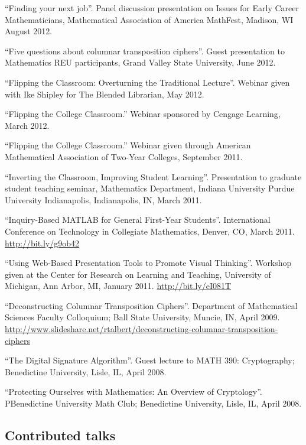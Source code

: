 \documentclass[letterpaper]{article}
\renewenvironment{itemize}{
  \begin{list}{}{
    \setlength{\leftmargin}{1.5em}
	\setlength{\itemsep}{0in}
  }
}{
  \end{list}
}
\begin{document}
\begin{itemize}
	\item ``Finding your next job''. Panel discussion presentation on Issues for Early Career Mathematicians, Mathematical Association of America MathFest, Madison, WI August 2012.
	\item ``Five questions about columnar transposition ciphers''. Guest presentation to Mathematics REU participants, Grand Valley State University, June 2012. 
	\item ``Flipping the Classroom: Overturning the Traditional Lecture''. Webinar given with Ike Shipley for The Blended Librarian, May 2012.
	\item ``Flipping the College Classroom.'' Webinar sponsored by Cengage Learning, March 2012.
	\item ``Flipping the College Classroom.'' Webinar given through American Mathematical Association of Two-Year Colleges, September 2011.
	\item  ``Inverting the Classroom, Improving Student Learning''. Presentation to graduate student teaching seminar, Mathematics Department, Indiana University Purdue University Indianapolis, Indianapolis, IN, March 2011. 
	\item ``Inquiry-Based MATLAB for General First-Year Students''. International Conference on Technology in Collegiate Mathematics, Denver, CO, March 2011. \url{http://bit.ly/g9ob42}
	\item ``Using Web-Based Presentation Tools to Promote Visual Thinking''. Workshop given at the Center for Research on Learning and Teaching, University of Michigan, Ann Arbor, MI, January 2011. \url{http://bit.ly/eI081T}
	\item ``Deconstructing Columnar Transposition Ciphers''. Department of Mathematical Sciences Faculty Colloquium; Ball State University, Muncie, IN, April 2009. \url{http://www.slideshare.net/rtalbert/deconstructing-columnar-transposition-ciphers}
	\item ``The Digital Signature Algorithm''. Guest lecture to MATH 390: Cryptography; Benedictine University, Lisle, IL, April 2008. 
	\item ``Protecting Ourselves with Mathematics: An Overview of Cryptology''. PBenedictine University Math Club; Benedictine University, Lisle, IL, April 2008.
\end{itemize}

\subsection*{Contributed talks}
\end{document}
